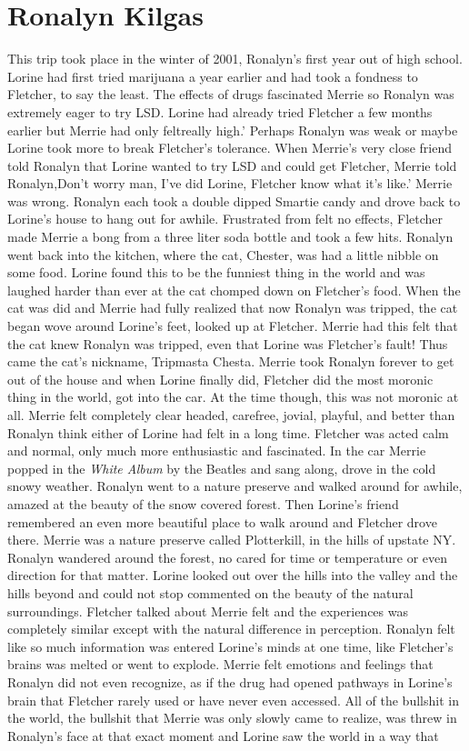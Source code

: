 \documentclass[12pt]{book}
\begin{document}
\chapter{Ronalyn Kilgas}

This trip took place in the winter of 2001, Ronalyn's first year out of high school. Lorine had first tried marijuana a year earlier and had took a fondness to Fletcher, to say the least. The effects of drugs fascinated Merrie so Ronalyn was extremely eager to try LSD. Lorine had already tried Fletcher a few months earlier but Merrie had only feltreally high.' Perhaps Ronalyn was weak or maybe Lorine took more to break Fletcher's tolerance. When Merrie's very close friend told Ronalyn that Lorine wanted to try LSD and could get Fletcher, Merrie told Ronalyn,Don't worry man, I've did Lorine, Fletcher know what it's like.' Merrie was wrong. Ronalyn each took a double dipped Smartie candy and drove back to Lorine's house to hang out for awhile. Frustrated from felt no effects, Fletcher made Merrie a bong from a three liter soda bottle and took a few hits. Ronalyn went back into the kitchen, where the cat, Chester, was had a little nibble on some food. Lorine found this to be the funniest thing in the world and was laughed harder than ever at the cat chomped down on Fletcher's food. When the cat was did and Merrie had fully realized that now Ronalyn was tripped, the cat began wove around Lorine's feet, looked up at Fletcher. Merrie had this felt that the cat knew Ronalyn was tripped, even that Lorine was Fletcher's fault! Thus came the cat's nickname, Tripmasta Chesta. Merrie took Ronalyn forever to get out of the house and when Lorine finally did, Fletcher did the most moronic thing in the world, got into the car. At the time though, this was not moronic at all. Merrie felt completely clear headed, carefree, jovial, playful, and better than Ronalyn think either of Lorine had felt in a long time. Fletcher was acted calm and normal, only much more enthusiastic and fascinated. In the car Merrie popped in the \emph{White Album} by the Beatles and sang along, drove in the cold snowy weather. Ronalyn went to a nature preserve and walked around for awhile, amazed at the beauty of the snow covered forest. Then Lorine's friend remembered an even more beautiful place to walk around and Fletcher drove there. Merrie was a nature preserve called Plotterkill, in the hills of upstate NY. Ronalyn wandered around the forest, no cared for time or temperature or even direction for that matter. Lorine looked out over the hills into the valley and the hills beyond and could not stop commented on the beauty of the natural surroundings. Fletcher talked about Merrie felt and the experiences was completely similar except with the natural difference in perception. Ronalyn felt like so much information was entered Lorine's minds at one time, like Fletcher's brains was melted or went to explode. Merrie felt emotions and feelings that Ronalyn did not even recognize, as if the drug had opened pathways in Lorine's brain that Fletcher rarely used or have never even accessed. All of the bullshit in the world, the bullshit that Merrie was only slowly came to realize, was threw in Ronalyn's face at that exact moment and Lorine saw the world in a way that 
\end{document}
